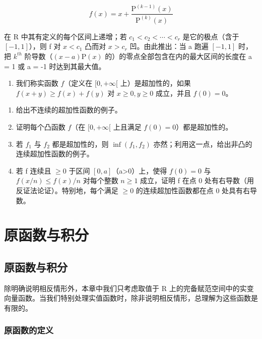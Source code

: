 \[
f (x) = x + \frac {\mathrm{P} ^ {(k - 1)} (x)}{\mathrm{P} ^ {(k)} (x)}
\]

在 R 中其有定义的每个区间上递增；若 \(c_{1} < c_{2} < \cdots < c_{r}\) 是它的极点（含于 \([-1, 1]\)），则 f 对 \(x < c_{1}\) 凸而对 \(x > c_{r}\) 凹。由此推出：当 a 跑遍 \([-1, 1]\) 时，把 \(k^{th}\) 阶导数（\((x - a)\mathrm{P}(x)\) 的）的零点全部包含在内的最大区间的长度在 a = 1 或 a = -1 时达到其最大值。

\begin{enumerate}
\def\labelenumi{\arabic{enumi})}
\setcounter{enumi}{24}
\tightlist
\item
  我们称实函数 \(f\)（定义在 \([0, +\infty[\) 上）是超加性的，如果 \(f(x + y) \geqslant f(x) + f(y)\) 对 \(x \geqslant 0, y \geqslant 0\) 成立，并且 \(f(0) = 0\)。
\end{enumerate}

\begin{enumerate}
\def\labelenumi{\alph{enumi})}
\item
  给出不连续的超加性函数的例子。
\item
  证明每个凸函数 \(f\)（在 \([0, +\infty[\) 上且满足 \(f(0) = 0\)）都是超加性的。
\item
  若 \(f_{1}\) 与 \(f_{2}\) 都是超加性的，则 \(\inf (f_1, f_2)\) 亦然；利用这一点，给出非凸的连续超加性函数的例子。
\item
  若 f 连续且 \(\geqslant0\) 于区间 \([0,a]\)（a\textgreater0）上，使得 \(f(0)=0\) 与 \(f(x/n)\leqslant f(x)/n\) 对每个整数 \(n\geqslant1\) 成立，证明 f 在点 0 处有右导数（用反证法论证）。特别地，每个满足 \(\geqslant0\) 的连续超加性函数都在点 0 处具有右导数。
\end{enumerate}

\chapter{原函数与积分}

\section{原函数与积分}

除明确说明相反情形外，本章中我们只考虑取值于 R 上的完备赋范空间中的实变向量函数。当我们特别处理实值函数时，除非说明相反情形，总理解为这些函数是有限的。

\subsection{原函数的定义}

